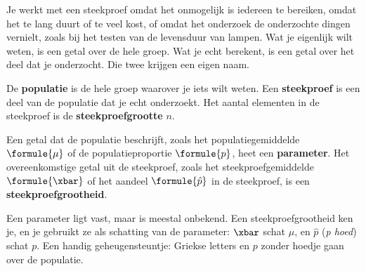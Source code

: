 Je werkt met een steekproef omdat het onmogelijk is iedereen te bereiken, omdat het te lang duurt of te veel kost, of omdat het onderzoek de onderzochte dingen vernielt, zoals bij het testen van de levensduur van lampen. Wat je eigenlijk wilt weten, is een getal over de hele groep. Wat je echt berekent, is een getal over het deel dat je onderzocht. Die twee krijgen een eigen naam.

\begin{theorie}
De \textbf{\textcolor{accent}{populatie}} is de hele groep waarover je iets wilt weten. Een \textbf{\textcolor{accent}{steekproef}} is een deel van de populatie dat je echt onderzoekt. Het aantal elementen in de steekproef is de \textbf{\textcolor{accent}{steekproefgrootte}} $n$.

\vspace{1mm}
Een getal dat de populatie beschrijft, zoals het populatiegemiddelde $\formule{\mu}$ of de populatieproportie $\formule{p}$, heet een \textbf{\textcolor{accent}{parameter}}. Het overeenkomstige getal uit de steekproef, zoals het steekproefgemiddelde $\formule{\xbar}$ of het aandeel $\formule{\hat{p}}$ in de steekproef, is een \textbf{\textcolor{accent}{steekproefgrootheid}}.
\end{theorie}

Een parameter ligt vast, maar is meestal onbekend. Een steekproefgrootheid ken je, en je gebruikt ze als schatting van de parameter: $\xbar$ schat $\mu$, en $\hat{p}$ (\textit{p hoed}) schat $p$. Een handig geheugensteuntje: Griekse letters en $p$ zonder hoedje gaan over de populatie.


